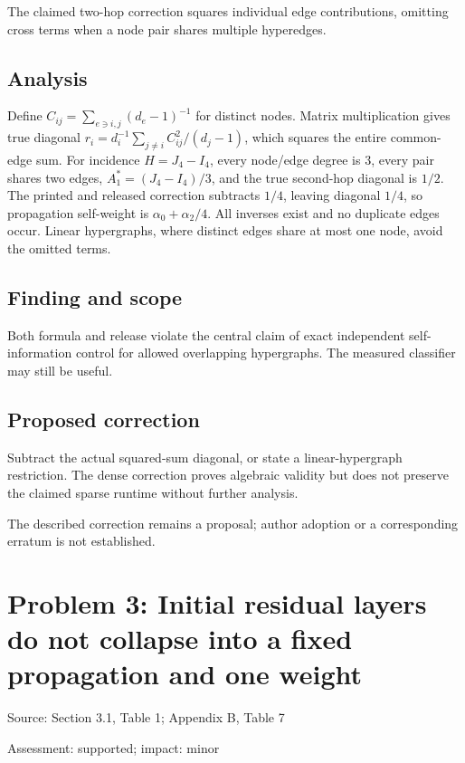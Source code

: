 \documentclass[11pt]{article}
\begin{document}
The claimed two-hop correction squares individual edge contributions, omitting cross terms when a node pair shares multiple hyperedges.

\subsection*{Analysis}

Define \(C_{ij}=\sum_{e\ni i,j}(d_e-1)^{-1}\) for distinct nodes. Matrix multiplication gives true diagonal \(r_i=d_i^{-1}\sum_{j\ne i}C_{ij}^2/(d_j-1)\), which squares the entire common-edge sum. For incidence \(H=J_4-I_4\), every node/edge degree is \(3\), every pair shares two edges, \(A_1^*=(J_4-I_4)/3\), and the true second-hop diagonal is \(1/2\). The printed and released correction subtracts \(1/4\), leaving diagonal \(1/4\), so propagation self-weight is \(\alpha_0+\alpha_2/4\). All inverses exist and no duplicate edges occur. Linear hypergraphs, where distinct edges share at most one node, avoid the omitted terms.

\subsection*{Finding and scope}

Both formula and release violate the central claim of exact independent self-information control for allowed overlapping hypergraphs. The measured classifier may still be useful.

\subsection*{Proposed correction}

Subtract the actual squared-sum diagonal, or state a linear-hypergraph restriction. The dense correction proves algebraic validity but does not preserve the claimed sparse runtime without further analysis.

The described correction remains a proposal; author adoption or a corresponding erratum is not established.

\section*{Problem 3: Initial residual layers do not collapse into a fixed propagation and one weight}

Source: Section 3.1, Table 1; Appendix B, Table 7

Assessment: supported; impact: minor
\end{document}
